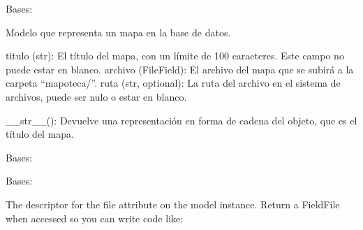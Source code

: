 \documentclass[letterpaper,10pt,spanish]{sphinxmanual}
\begin{document}
\begin{fulllineitems}

\pysigstartsignatures
{}
\pysigstopsignatures
\sphinxAtStartPar
Bases: 

\sphinxAtStartPar
Modelo que representa un mapa en la base de datos.
\begin{description}
\sphinxAtStartPar
titulo (str): El título del mapa, con un límite de 100 caracteres. Este campo no puede estar en blanco.
archivo (FileField): El archivo del mapa que se subirá a la carpeta “mapoteca/”.
ruta (str, optional): La ruta del archivo en el sistema de archivos, puede ser nulo o estar en blanco.

\sphinxAtStartPar
\_\_str\_\_(): Devuelve una representación en forma de cadena del objeto, que es el título del mapa.

\end{description}


\begin{fulllineitems}

\pysigstartsignatures
{}
\pysigstopsignatures
\sphinxAtStartPar
Bases: 

\end{fulllineitems}



\begin{fulllineitems}

\pysigstartsignatures
{}
\pysigstopsignatures
\sphinxAtStartPar
Bases: 

\end{fulllineitems}



\begin{fulllineitems}

\pysigstartsignatures
{}
\pysigstopsignatures
\sphinxAtStartPar
The descriptor for the file attribute on the model instance. Return a
FieldFile when accessed so you can write code like:


\end{fulllineitems}
\end{fulllineitems}
\end{document}
